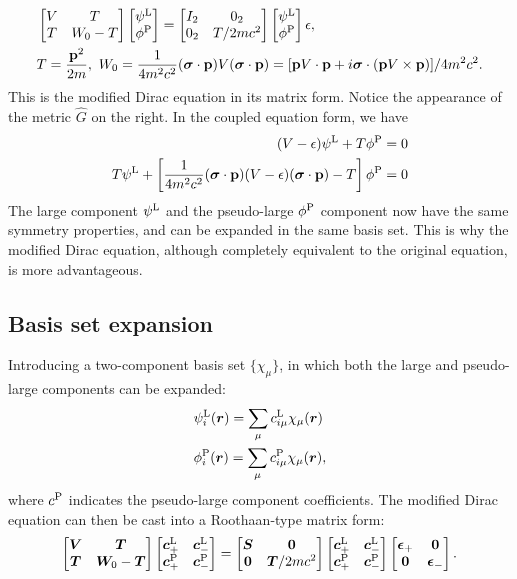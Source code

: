 \documentclass{article}
\begin{document}
\begin{align}
    &\begin{bmatrix}
        V & T \\
        T & W_0-T
    \end{bmatrix}
    \begin{bmatrix}
        \psi\lgc \\
        \phi\plc
    \end{bmatrix}=
    \begin{bmatrix}
        I_2 & 0_2 \\
        0_2 & T/2mc^2
    \end{bmatrix}
    \begin{bmatrix}
        \psi\lgc \\
        \phi\plc
    \end{bmatrix}\epsilon,\\
    &T=\frac{\bvec{p}^2}{2m},\ W_0=\frac{1}{4m^2c^2}(\bvec{\sigma}\cdot\bvec{p})V(\bvec{\sigma}\cdot\bvec{p})=[\bvec{p}V\cdot\bvec{p} +i\bvec{\sigma}\cdot(\bvec{p}V\times\bvec{p})]/4m^2c^2 .
\end{align}
This is the modified Dirac equation in its matrix form. Notice the appearance of the metric $\hat{G}$ on the right. In the coupled equation form, we have
\begin{align}
    (V-\epsilon)\psi^{\mathrm{L}}+T\phi^{\mathrm{P}}&=0\\
    T\psi^{\mathrm{L}}+\left[ \frac{1}{4m^2c^2}(\bm{\mathrm{\sigma}}\cdot\bm{\mathrm{p}})(V-\epsilon)(\bm{\mathrm{\sigma}}\cdot\bm{\mathrm{p}})-T \right]\phi^{\mathrm{P}}&=0
\end{align}
The large component $\psi^{\mathrm{L}}$ and the pseudo-large $\phi^{\mathrm{P}}$ component now have the same symmetry properties, and can be expanded in the same basis set. This is why the modified Dirac equation, although completely equivalent to the original equation, is more advantageous.

\subsection{Basis set expansion}
Introducing a two-component basis set $\{ \chi _{\mu}\}$, in which both the large and pseudo-large components can be expanded:
\begin{align}
    &\psi^{\mathrm{L}}_i(\bm{r})=\sum_{\mu}c_{i\mu}^{\mathrm{L}} \chi _{\mu}(\bm{r})\\
    &\phi^{\mathrm{P}}_i(\bm{r})=\sum_{\mu}c_{i\mu}^{\mathrm{P}} \chi _{\mu}(\bm{r}),
\end{align}
where $c^{\mathrm{P}}$ indicates the pseudo-large component coefficients. The modified Dirac equation can then be cast into a Roothaan-type matrix form:
\begin{equation}
\begin{bmatrix}{\bm{V}}&{\bm{T}}\\{\bm{T}}&{\bm{W}_0-\bm{T}}\end{bmatrix}\begin{bmatrix}{\bm{c}_+^{\mathrm{L}}}&{\bm{c}_-^{\mathrm{L}}}\\{\bm{c}_+^{\mathrm{P}}}&{\bm{c}_-^{\mathrm{P}}}\end{bmatrix}
=\begin{bmatrix}{\bm{S}}&{\bm{0}}\\{\bm{0}}&{\bm{T}/2mc^2}\end{bmatrix}\begin{bmatrix}{\bm{c}_+^{\mathrm{L}}}&{\bm{c}_-^{\mathrm{L}}}\\{\bm{c}_+^{\mathrm{P}}}&{\bm{c}_-^{\mathrm{P}}}\end{bmatrix}\begin{bmatrix}{\bm{\epsilon}_+}&{\bm{0}}\\{\bm{0}}&{\bm{\epsilon}_-}\end{bmatrix}.
\end{equation}
\end{document}
